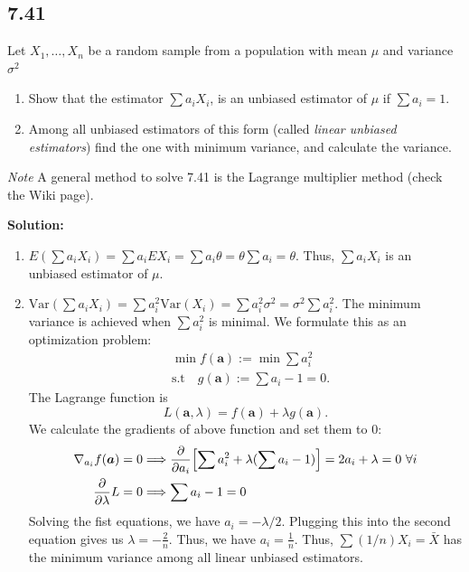 \documentclass[11pt]{article}
\newcommand{\Sol}{\par {\bf Solution:}}
\newcommand{\sample}[1]{#1_1 , \dots , #1_n}
\newcommand{\Partial}[1]{\frac{\partial}{\partial #1}}
\begin{document}
\subsection*{7.41}
Let $\sample{X}$ be a random sample from a population with mean $\mu$ and variance $\sigma^2$
\begin{enumerate}[label=(\alph*)]
    \item Show that the estimator $\sum a_iX_i$, is an unbiased estimator of $\mu$ if $\sum a_i = 1$.
    \item
    Among all unbiased estimators of this form (called \emph{linear unbiased estimators}) find the one with minimum variance, and calculate the variance.
    
\end{enumerate}

\emph{Note} A general method to solve 7.41 is the Lagrange multiplier method (check the Wiki page).

\Sol
\begin{enumerate}[label=(\alph*)]
    \item
    $E(\sum a_iX_i) = \sum a_iEX_i = \sum a_i \theta = \theta \sum a_i = \theta$. Thus, $\sum a_iX_i$ is an unbiased estimator of $\mu$.
    \item
    $\text{Var}(\sum a_iX_i) = \sum a_i^2 \text{Var}(X_i) = \sum a_i^2\sigma^2 = \sigma^2\sum a_i^2$. The minimum variance is achieved when $\sum a_i^2$ is minimal. We formulate this as an optimization problem:
    \begin{align*}
    &\min f(\boldsymbol a):= \min \sum a_i^2 \\
    &\text{s.t} \quad g(\boldsymbol a):= \sum a_i - 1 = 0.
    \end{align*}
    The Lagrange function is 
    \[
    L(\boldsymbol a, \lambda) = f(\boldsymbol a) + \lambda g(\boldsymbol a).
    \]
    We calculate the gradients of above function and set them to 0:
    \begin{align*}
        \nabla_{a_i} f(\boldsymbol a) = 0 &\Longrightarrow \Partial{a_i} \Bigl[ \sum a_i^2 + \lambda(\sum a_i -1) \Bigr] = 2a_i + \lambda = 0 ~ \forall i\\
        \Partial{\lambda} L = 0 &\Longrightarrow \sum a_i -1 = 0
    \end{align*}
    Solving the fist equations, we have $a_i = - \lambda /2$. Plugging this into the second equation gives us $\lambda = -\frac{2}{n}$. Thus, we have $a_i = \frac{1}{n}$. Thus, $\sum (1/n)X_i = \bar X$ has the minimum variance among all linear unbiased estimators.
    
\end{enumerate}
\end{document}
